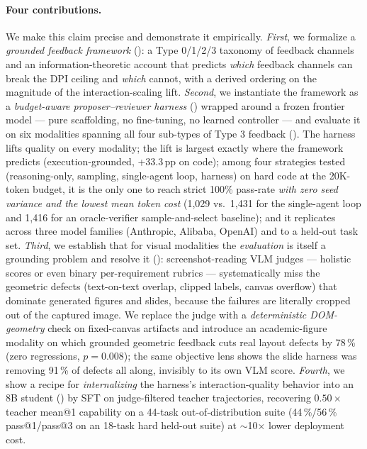 \documentclass[11pt]{article}
\begin{document}
\paragraph{Four contributions.} We make this claim precise and demonstrate it empirically.
\textit{First}, we formalize a \emph{grounded feedback framework} (): a Type 0/1/2/3 taxonomy of feedback channels and an information-theoretic account that predicts \emph{which} feedback channels can break the DPI ceiling and \emph{which} cannot, with a derived ordering on the magnitude of the interaction-scaling lift.
\textit{Second}, we instantiate the framework as a \emph{budget-aware proposer--reviewer harness} () wrapped around a frozen frontier model --- pure scaffolding, no fine-tuning, no learned controller --- and evaluate it on six modalities spanning all four sub-types of Type 3 feedback (). The harness lifts quality on every modality; the lift is largest exactly where the framework predicts (execution-grounded, +33.3\,pp on code); among four strategies tested (reasoning-only, sampling, single-agent loop, harness) on hard code at the 20K-token budget, it is the only one to reach strict 100\% pass-rate \emph{with zero seed variance and the lowest mean token cost} (1{,}029 vs.\ 1{,}431 for the single-agent loop and 1{,}416 for an oracle-verifier sample-and-select baseline); and it replicates across three model families (Anthropic, Alibaba, OpenAI) and to a held-out task set.
\textit{Third}, we establish that for visual modalities the \emph{evaluation} is itself a grounding problem and resolve it (): screenshot-reading VLM judges --- holistic scores or even binary per-requirement rubrics --- systematically miss the geometric defects (text-on-text overlap, clipped labels, canvas overflow) that dominate generated figures and slides, because the failures are literally cropped out of the captured image. We replace the judge with a \emph{deterministic DOM-geometry} check on fixed-canvas artifacts and introduce an academic-figure modality on which grounded geometric feedback cuts real layout defects by 78\,\% (zero regressions, $p{=}0.008$); the same objective lens shows the slide harness was removing 91\,\% of defects all along, invisibly to its own VLM score.
\textit{Fourth}, we show a recipe for \emph{internalizing} the harness's interaction-quality behavior into an 8B student () by SFT on judge-filtered teacher trajectories, recovering $0.50\times$ teacher mean@1 capability on a 44-task out-of-distribution suite (44\,\%/56\,\% pass@1/pass@3 on an 18-task hard held-out suite) at $\sim$10$\times$ lower deployment cost.
\end{document}
